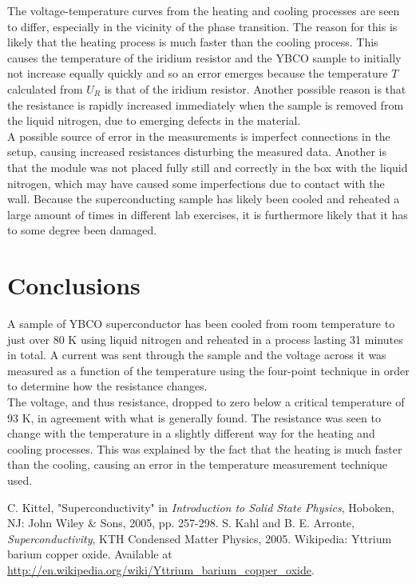 \documentclass[12pt,a4paper]{article}
\begin{document}
The voltage-temperature curves from the heating and cooling processes are seen to differ, especially in the vicinity of the phase transition. The reason for this is likely that the heating process is much faster than the cooling process. This causes the temperature of the iridium resistor and the YBCO sample to initially not increase equally quickly and so an error emerges because the temperature $T$ calculated from $U_R$ is that of the iridium resistor. Another possible reason is that the resistance is rapidly increased immediately when the sample is removed from the liquid nitrogen, due to emerging defects in the material.\\

A possible source of error in the measurements is imperfect connections in the setup, causing increased resistances disturbing the measured data. Another is that the module was not placed fully still and correctly in the box with the liquid nitrogen, which may have caused some imperfections due to contact with the wall. Because the superconducting sample has likely been cooled and reheated a large amount of times in different lab exercises, it is furthermore likely that it has to some degree been damaged.

\section{Conclusions}

A sample of YBCO superconductor has been cooled from room temperature to just over 80 K using liquid nitrogen and reheated in a process lasting 31 minutes in total. A current was sent through the sample and the voltage across it was measured as a function of the temperature using the four-point technique in order to determine how the resistance changes. \\

The voltage, and thus resistance, dropped to zero below a critical temperature of 93 K, in agreement with what is generally found. The resistance was seen to change with the temperature in a slightly different way for the heating and cooling processes. This was explained by the fact that the heating is much faster than the cooling, causing an error in the temperature measurement technique used.

\begin{thebibliography}{9}
 C. Kittel, "Superconductivity" in \emph{Introduction to Solid State Physics}, Hoboken, NJ: John Wiley \& Sons, 2005, pp. 257-298.
 S. Kahl and B. E. Arronte, \emph{Superconductivity}, KTH Condensed Matter Physics, 2005.
 Wikipedia: Yttrium barium copper oxide. Available at \url{http://en.wikipedia.org/wiki/Yttrium_barium_copper_oxide}.
\end{thebibliography}
\end{document}
